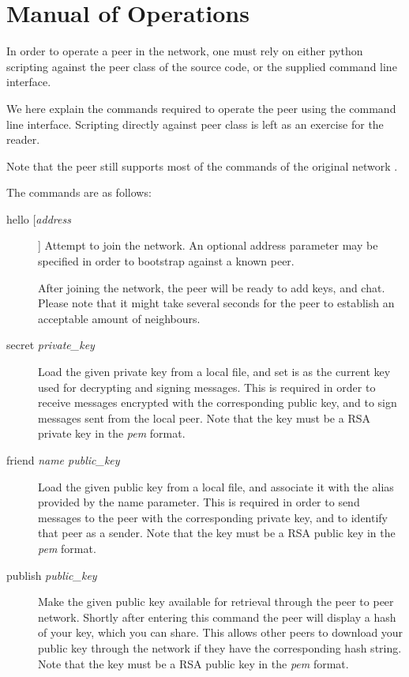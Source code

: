 \section{Manual of Operations}

In order to operate a peer in the network, one must rely on either python scripting against the peer class of the source code, or the supplied command line interface.

We here explain the commands required to operate the peer using the command line interface. Scripting directly against peer class is left as an exercise for the reader.

Note that the peer still supports most of the commands of the original network \citep{P2PN}.

The commands are as follows:

\begin{description}
\item[hello [\textit{address}]] Attempt to join the network. An optional address parameter may be specified in order to bootstrap against a known peer.

After joining the network, the peer will be ready to add keys, and chat. Please note that it might take several seconds for the peer to establish an acceptable amount of neighbours.

\item[secret \textit{private\_key}]
Load the given private key from a local file, and set is as the current key used for decrypting and signing messages. 
This is required in order to receive messages encrypted with the corresponding public key, and to sign messages sent from the local peer.
Note that the key must be a RSA private key in the \textit{pem} format.

\item[friend \textit{name public\_key}]
Load the given public key from a local file, and associate it with the alias provided by the name parameter. 
This is required in order to send messages to the peer with the corresponding private key, and to identify that peer as a sender.
Note that the key must be a RSA public key in the \textit{pem} format.

\item[publish \textit{public\_key}]
Make the given public key available for retrieval through the peer to peer network. Shortly after entering this command the peer will display a hash of your key, which you can share. This allows other peers to download your public key through the network if they have the corresponding hash string.
Note that the key must be a RSA public key in the \textit{pem} format.


\end{description}
